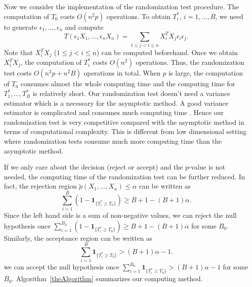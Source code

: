 \documentclass[smallcondensed,final,natbib]{svjour3}          %
\begin{document}
Now we consider the implementation of the randomization test procedure.
The computation of $T_0$ costs $O(n^2 p)$ operations.
To obtain $T_i^*$, $i=1,\ldots,B$, we need to generate $\epsilon_1,\ldots,\epsilon_n$ and compute
\begin{equation*}
T(\epsilon_1 X_1,\ldots,\epsilon_n X_n)
=\sum_{1\leq j<i \leq n}X_i^T X_j \epsilon_i \epsilon_j.
\end{equation*}
Note that $X_i^T X_j$ ($1\leq j<i\leq n$) can be computed beforehand.
Once we obtain $X_i^T X_j$, the computation of $T_i^*$ costs $O(n^2)$ operations.
Thus, the randomization test costs $O(n^2 p+n^2 B)$ operations in total.
When $p$ is large, the computation of $T_0$ consumes almost the whole computing time and the computing time for $T_1^*,\ldots,T_B^*$ is relatively short.
Our randomization test doesn't need a variance estimator which is a necessary for the asymptotic method. 
A good variance estimator is complicated and consumes much computing time  \citep{Chen2010A}.
Hence our randomization test is very competitive compared with the asymptotic method in terms of computational complexity.
This is different from low dimensional setting where randomization tests consume much more computing time than the asymptotic method.

If we only care about the decision (reject or accept) and the $p$-value is not needed, the computing time of the randomization test can be further reduced.
In fact, the rejection region $\tilde{p}(X_1,\ldots, X_n)\leq \alpha$ can be written as
\begin{equation*}
\sum_{i=1}^B (1-\mathbf{1}_{\{T_i^*\geq T_0\}})\geq B +1-(B+1)\alpha.
\end{equation*}
Since the left hand side is a sum of non-negative values, we can reject the null hypothesis once $\sum_{i=1}^{B_0} (1-\mathbf{1}_{\{T_i^*\geq T_0\}})\geq B +1-(B+1)\alpha$ for some $B_0$.
Similarly, the acceptance region can be written as
\begin{equation*}
\sum_{i=1}^B \mathbf{1}_{\{T_i^*\geq T_0\}}> (B+1)\alpha -1.
\end{equation*}
we can accept the null hypothesis once
$\sum_{i=1}^{B_0} \mathbf{1}_{\{T_i^*\geq T_0\}}> (B+1)\alpha -1$ for some $B_0$.
Algorithm~\ref{theAlgorithm} summarizes our computing method.
\end{document}
